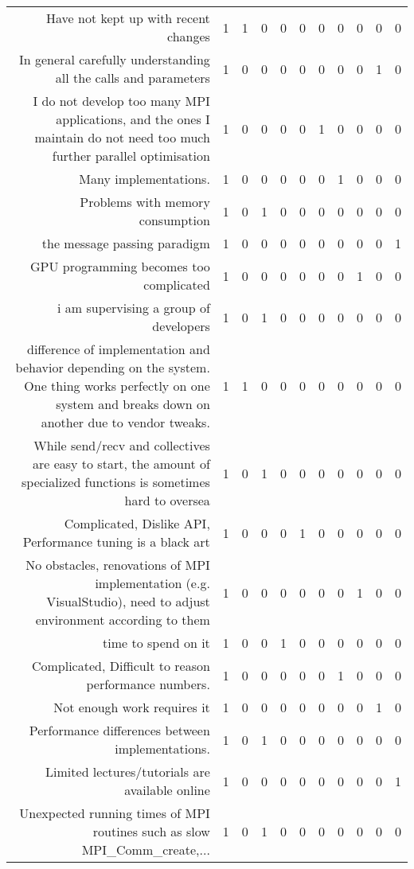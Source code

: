 {\begin{landscape}
\begin{longtable}[htb]{r|c|c|c|c|c|c|c|c|c|c}
{Have not kept up with recent changes} & 1 & 1 & 0 & 0 & 0 & 0 & 0 & 0 & 0 & 0 \\%
{In general carefully understanding all the calls and parameters} & 1 & 0 & 0 & 0 & 0 & 0 & 0 & 0 & 1 & 0 \\%
{I do not develop too many MPI applications, and the ones I maintain do not need too much further parallel optimisation} & 1 & 0 & 0 & 0 & 0 & 1 & 0 & 0 & 0 & 0 \\%
{Many implementations.} & 1 & 0 & 0 & 0 & 0 & 0 & 1 & 0 & 0 & 0 \\%
{Problems with memory consumption} & 1 & 0 & 1 & 0 & 0 & 0 & 0 & 0 & 0 & 0 \\%
{the message passing paradigm} & 1 & 0 & 0 & 0 & 0 & 0 & 0 & 0 & 0 & 1 \\%
{GPU programming becomes too complicated} & 1 & 0 & 0 & 0 & 0 & 0 & 0 & 1 & 0 & 0 \\%
{i am supervising a group of developers} & 1 & 0 & 1 & 0 & 0 & 0 & 0 & 0 & 0 & 0 \\%
{difference of implementation and behavior depending on the system. One thing works perfectly on one system and breaks down on another due to vendor tweaks.} & 1 & 1 & 0 & 0 & 0 & 0 & 0 & 0 & 0 & 0 \\%
{While send/recv and collectives are easy to start, the amount of specialized functions is sometimes hard to oversea} & 1 & 0 & 1 & 0 & 0 & 0 & 0 & 0 & 0 & 0 \\%
{Complicated, Dislike API, Performance tuning is a black art} & 1 & 0 & 0 & 0 & 1 & 0 & 0 & 0 & 0 & 0 \\%
{No obstacles, renovations of MPI implementation (e.g. VisualStudio), need to adjust environment according to them} & 1 & 0 & 0 & 0 & 0 & 0 & 0 & 1 & 0 & 0 \\%
{time to spend on it} & 1 & 0 & 0 & 1 & 0 & 0 & 0 & 0 & 0 & 0 \\%
{Complicated, Difficult to reason performance numbers.} & 1 & 0 & 0 & 0 & 0 & 0 & 1 & 0 & 0 & 0 \\%
{Not enough work requires it} & 1 & 0 & 0 & 0 & 0 & 0 & 0 & 0 & 1 & 0 \\%
{Performance differences between implementations.} & 1 & 0 & 1 & 0 & 0 & 0 & 0 & 0 & 0 & 0 \\%
{Limited lectures/tutorials are available online} & 1 & 0 & 0 & 0 & 0 & 0 & 0 & 0 & 0 & 1 \\%
{Unexpected running times of MPI routines such as slow MPI\_Comm\_create,...} & 1 & 0 & 1 & 0 & 0 & 0 & 0 & 0 & 0 & 0 \\%

\end{longtable}
\end{landscape}}
